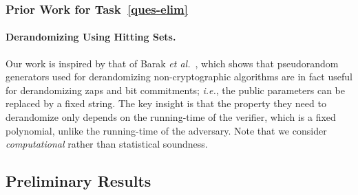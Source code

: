 \subsubsection{Prior Work for Task~\ref{ques-elim}}


\paragraph*{Derandomizing Using Hitting Sets.}
Our work is inspired by that of Barak \emph{et al.}~\cite{C:BarOngVad03},  which  shows that pseudorandom generators used for derandomizing non-cryptographic algorithms are in fact useful for derandomizing zaps and bit commitments; \emph{i.e.}, the public parameters can be replaced by a fixed string.  The key insight is that the property they need to derandomize only depends on the running-time of the verifier, which is a fixed polynomial, unlike the running-time of the adversary.  Note that we consider \emph{computational} rather than statistical soundness.




\subsection{Preliminary Results}

